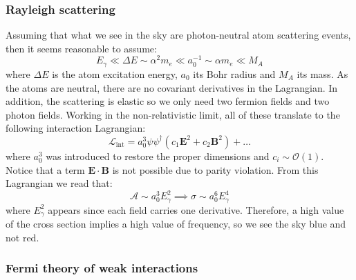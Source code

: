 \documentclass[11pt]{article}
\begin{document}
\subsubsection{Rayleigh scattering}
Assuming that what we see in the sky are photon-neutral atom scattering events, then it seems reasonable to assume:
\begin{equation}
    E_\gamma\ll \Delta E\sim \alpha^2 m_e\ll a_0^{-1}\sim \alpha m_e\ll M_A
\end{equation}
where $\Delta E$ is the atom excitation energy, $a_0$ its Bohr radius and $M_A$ its mass. As the atoms are neutral, there are no covariant derivatives in the Lagrangian. In addition, the scattering is elastic so we only need two fermion fields and two photon fields. Working in the non-relativistic limit, all of these translate to the following interaction Lagrangian:
\begin{equation}
    \mathcal{L}_{\text{int}}=a_0^{3}\psi\psi^\dagger(c_1\boldsymbol{E}^2+c_2\boldsymbol{B}^2)+\ldots
\end{equation}
where $a_0^3$ was introduced to restore the proper dimensions and $c_i\sim \mathcal{O}(1)$. Notice that a term $\boldsymbol{E}\cdot\boldsymbol{B}$ is not possible due to parity violation. From this Lagrangian we read that:
\begin{equation}
    \mathcal{A}\sim a_0^3E_\gamma^2\implies \sigma \sim a_0^6E_\gamma^4
\end{equation}
where $E_\gamma^2$ appears since each field carries one derivative. Therefore, a high value of the cross section implies a high value of frequency, so we see the sky blue and not red.
\subsubsection{Fermi theory of weak interactions}
\end{document}
